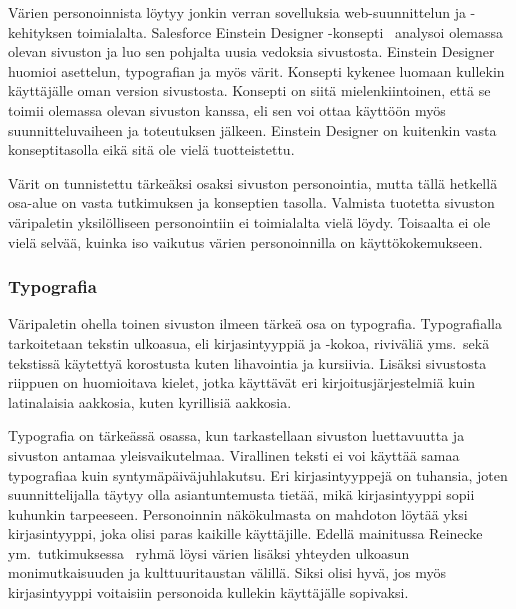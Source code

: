 \documentclass[finnish, 12pt, a4paper, elec, utf8, a-1b]{aaltothesis}
\begin{document}
Värien personoinnista löytyy jonkin verran sovelluksia web-suunnittelun ja
-kehityksen toimialalta. Salesforce Einstein Designer
-konsepti~\cite{salesforce-einstein-designer} analysoi olemassa olevan sivuston
ja luo sen pohjalta uusia vedoksia sivustosta. Einstein Designer huomioi
asettelun, typografian ja myös värit. Konsepti kykenee luomaan kullekin
käyttäjälle oman version sivustosta. Konsepti on siitä mielenkiintoinen, että se
toimii olemassa olevan sivuston kanssa, eli sen voi ottaa käyttöön myös
suunnitteluvaiheen ja toteutuksen jälkeen. Einstein Designer on kuitenkin vasta
konseptitasolla eikä sitä ole vielä tuotteistettu.

Värit on tunnistettu tärkeäksi osaksi sivuston personointia, mutta tällä
hetkellä osa-alue on vasta tutkimuksen ja konseptien tasolla. Valmista tuotetta
sivuston väripaletin yksilölliseen personointiin ei toimialalta vielä löydy.
Toisaalta ei ole vielä selvää, kuinka iso vaikutus värien personoinnilla on
käyttökokemukseen.

\subsubsection{Typografia}\label{typography-personalization}

Väripaletin ohella toinen sivuston ilmeen tärkeä osa on typografia.
Typografialla tarkoitetaan tekstin ulkoasua, eli kirjasintyyppiä ja -kokoa,
riviväliä yms.~sekä tekstissä käytettyä korostusta kuten lihavointia ja
kursiivia. Lisäksi sivustosta riippuen on huomioitava kielet, jotka käyttävät
eri kirjoitusjärjestelmiä kuin latinalaisia aakkosia, kuten kyrillisiä aakkosia.

Typografia on tärkeässä osassa, kun tarkastellaan sivuston luettavuutta ja
sivuston antamaa yleisvaikutelmaa. Virallinen teksti ei voi käyttää samaa
typografiaa kuin syntymäpäiväjuhlakutsu. Eri kirjasintyyppejä on tuhansia, joten
suunnittelijalla täytyy olla asiantuntemusta tietää, mikä kirjasintyyppi sopii
kuhunkin tarpeeseen. Personoinnin näkökulmasta on mahdoton löytää yksi
kirjasintyyppi, joka olisi paras kaikille käyttäjille. Edellä mainitussa
Reinecke ym.~tutkimuksessa~\cite{10.1145/2556288.2557052} ryhmä löysi värien
lisäksi yhteyden ulkoasun monimutkaisuuden ja kulttuuritaustan välillä. Siksi
olisi hyvä, jos myös kirjasintyyppi voitaisiin personoida kullekin käyttäjälle
sopivaksi.
\end{document}
